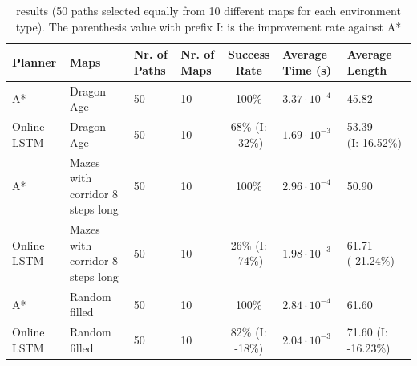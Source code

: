\begin{table}[h!]
    \centerfloat
    \begin{tabular}{|M{1.4cm}|M{2.3cm}|M{1.3cm}|M{1.3cm}|c|M{1.8cm}|M{1.7cm}|}
       \hline
       \textbf{Planner} & \textbf{Maps} & \textbf{Nr. of Paths} & \textbf{Nr. of Maps} & \textbf{Success Rate} & \textbf{Average Time (s)} & \textbf{Average Length} \\
       \hline
       A* & Dragon Age & 50 & 10 & 100\% & $3.37 \cdot 10^{-4}$ & 45.82 \\
       \hline
       Online LSTM & Dragon Age & 50 & 10 & 68\% (I: -32\%) & $1.69 \cdot 10^{-3}$ & 53.39 (I:-16.52\%) \\
       \hline
       A* & Mazes with corridor 8 steps long & 50 & 10 & 100\% & $2.96 \cdot 10^{-4}$ & 50.90\\
       \hline
       Online LSTM & Mazes with corridor 8 steps long & 50 & 10 & 26\% (I: -74\%) & $1.98 \cdot 10^{-3}$ & 61.71 (-21.24\%) \\
       \hline
       A* & Random filled & 50 & 10 & 100\% & $2.84 \cdot 10^{-4}$ & 61.60 \\
       \hline
       Online LSTM & Random filled & 50 & 10 & 82\% (I: -18\%) & $2.04 \cdot 10^{-3}$ & 71.60 (I: -16.23\%) \\
       \hline
    \end{tabular}
    \caption{\cite{nicola2018lstm} results (50 paths selected equally from 10 different maps for each environment type). The parenthesis value with prefix I: is the improvement rate against A*}
    \label{tab: nicola_results}
\end{table}

\pagebreak










\FloatBarrier


